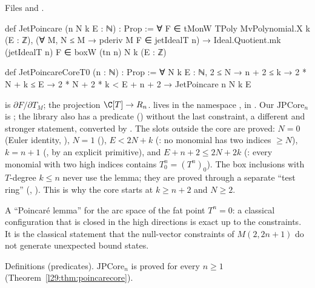 \noindent Files  and
.
\begin{leancode}
def JetPoincare (n N k E : ℕ) : Prop :=
  ∀ F ∈ tMonW TPoly MvPolynomial.X k (E : ℤ), (∀ M, N ≤ M → pderiv M F ∈ jetIdealT n) →
    Ideal.Quotient.mk (jetIdealT n) F ∈ boxW (tn n) N k (E : ℤ)

def JetPoincareCoreT0 (n : ℕ) : Prop :=
  ∀ N k E : ℕ, 2 ≤ N → n + 2 ≤ k → 2 * N + k ≤ E → 2 * N + 2 * k < E + n + 2 →
    JetPoincare n N k E
\end{leancode}

\begin{dictionary}
 is $\partial F/\partial T_M$;  the projection $\C[T]\to\ltwentynineRn$.
 lives in the namespace ,  in
. Our $\mathrm{JPCore}_n$ is ; the library also
has a predicate  () without the last constraint, a different and
stronger statement, converted by . The slots outside the core are proved: $N=0$ (Euler identity,
), $N=1$ (), $E<2N+k$ (: no monomial has two
indices $\ge N$), $k=n+1$ (, by an explicit primitive), and $E+n+2\le2N+2k$
(: every monomial with two high indices contains $T_0^n=(T^n)_0$). The box inclusions with
$T$-degree $k\le n$ never use the lemma; they are proved through a separate ``test ring''
(, ). This is why the core starts at $k\ge n+2$ and $N\ge2$.
\end{dictionary}

\begin{physics}
A ``Poincar\'e lemma'' for the arc space of the fat point $T^n=0$: a classical configuration that is closed in the high
directions is exact up to the constraints. It is the classical statement that the null-vector constraints of
$M(2,2n+1)$ do not generate unexpected bound states.
\end{physics}

\begin{status}
Definitions (predicates). $\mathrm{JPCore}_n$ is proved for every $n\ge1$ (Theorem~\ref{l29:thm:poincarecore}).
\end{status}

